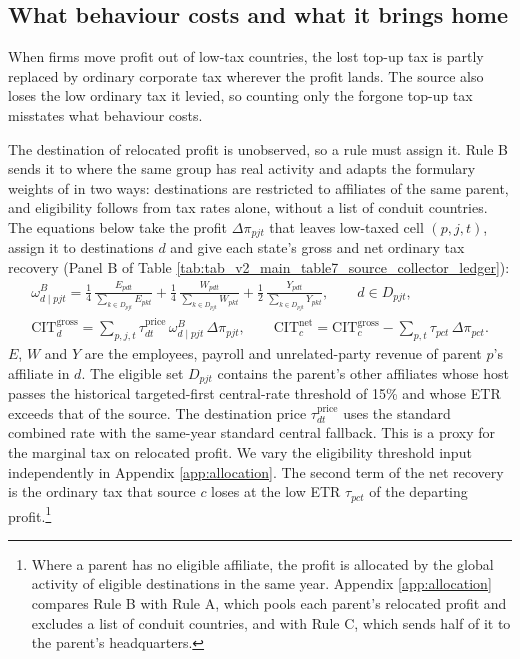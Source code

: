 \documentclass[11pt,a4paper]{article}
\begin{document}
\subsection{What behaviour costs and what it brings home}\label{sec:cit_recovery}

When firms move profit out of low-tax countries, the lost top-up tax is partly replaced by ordinary corporate tax wherever the profit lands. The source also loses the low ordinary tax it levied, so counting only the forgone top-up tax misstates what behaviour costs.

The destination of relocated profit is unobserved, so a rule must assign it. Rule B sends it to where the same group has real activity and adapts the formulary weights of \citet{garcia-bernardo2024} in two ways: destinations are restricted to affiliates of the same parent, and eligibility follows from tax rates alone, without a list of conduit countries. The equations below take the profit $\Delta\pi_{pjt}$ that leaves low-taxed cell $(p,j,t)$, assign it to destinations $d$ and give each state's gross and net ordinary tax recovery (Panel B of Table \ref{tab:tab_v2_main_table7_source_collector_ledger}):
\begin{gather}
\omega^{B}_{d\mid pjt} = \frac{1}{4}\,\frac{E_{pdt}}{\sum_{k\in D_{pjt}}E_{pkt}} + \frac{1}{4}\,\frac{W_{pdt}}{\sum_{k\in D_{pjt}}W_{pkt}} + \frac{1}{2}\,\frac{Y_{pdt}}{\sum_{k\in D_{pjt}}Y_{pkt}},\qquad d\in D_{pjt}, \label{eq:ruleb}\\
\mathrm{CIT}^{\mathrm{gross}}_{d} = \sum_{p,j,t}\tau^{\mathrm{price}}_{dt}\,\omega^{B}_{d\mid pjt}\,\Delta\pi_{pjt}, \qquad
\mathrm{CIT}^{\mathrm{net}}_{c} = \mathrm{CIT}^{\mathrm{gross}}_{c} - \sum_{p,t}\tau_{pct}\,\Delta\pi_{pct}. \label{eq:citrecovery}
\end{gather}
$E$, $W$ and $Y$ are the employees, payroll and unrelated-party revenue of parent $p$'s affiliate in $d$. The eligible set $D_{pjt}$ contains the parent's other affiliates whose host passes the historical targeted-first central-rate threshold of 15\% and whose ETR exceeds that of the source. The destination price $\tau^{\mathrm{price}}_{dt}$ uses the standard combined rate with the same-year standard central fallback. This is a proxy for the marginal tax on relocated profit. We vary the eligibility threshold input independently in Appendix \ref{app:allocation}. The second term of the net recovery is the ordinary tax that source $c$ loses at the low ETR $\tau_{pct}$ of the departing profit.\footnote{Where a parent has no eligible affiliate, the profit is allocated by the global activity of eligible destinations in the same year. Appendix \ref{app:allocation} compares Rule B with Rule A, which pools each parent's relocated profit and excludes a list of conduit countries, and with Rule C, which sends half of it to the parent's headquarters.}
\end{document}

